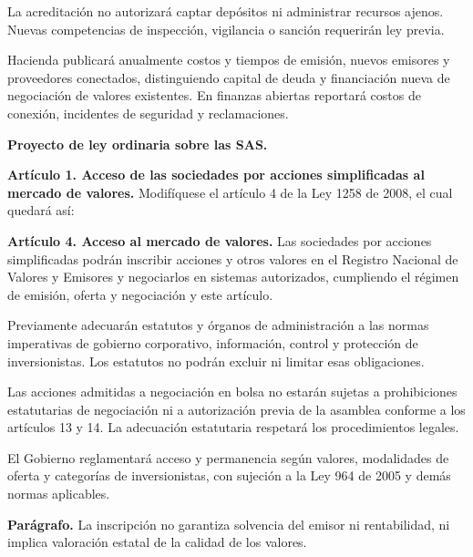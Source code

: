 La acreditación no autorizará captar depósitos ni administrar recursos ajenos. Nuevas competencias de inspección, vigilancia o sanción requerirán ley previa.

Hacienda publicará anualmente costos y tiempos de emisión, nuevos emisores y proveedores conectados, distinguiendo capital de deuda y financiación nueva de negociación de valores existentes. En finanzas abiertas reportará costos de conexión, incidentes de seguridad y reclamaciones.

\begingroup
\textbf{Proyecto de ley ordinaria sobre las SAS.}\par\nobreak

\begin{mdframed}[linewidth=0.6pt,linecolor=gray!60,backgroundcolor=gray!3,
  innertopmargin=10pt,innerbottommargin=10pt,innerleftmargin=10pt,innerrightmargin=10pt]
\textbf{Artículo 1. Acceso de las sociedades por acciones simplificadas al mercado de valores.} Modifíquese el artículo 4 de la Ley 1258 de 2008, el cual quedará así:

\textbf{Artículo 4. Acceso al mercado de valores.} Las sociedades por acciones simplificadas podrán inscribir acciones y otros valores en el Registro Nacional de Valores y Emisores y negociarlos en sistemas autorizados, cumpliendo el régimen de emisión, oferta y negociación y este artículo.

Previamente adecuarán estatutos y órganos de administración a las normas imperativas de gobierno corporativo, información, control y protección de inversionistas. Los estatutos no podrán excluir ni limitar esas obligaciones.

Las acciones admitidas a negociación en bolsa no estarán sujetas a prohibiciones estatutarias de negociación ni a autorización previa de la asamblea conforme a los artículos 13 y 14. La adecuación estatutaria respetará los procedimientos legales.

El Gobierno reglamentará acceso y permanencia según valores, modalidades de oferta y categorías de inversionistas, con sujeción a la Ley 964 de 2005 y demás normas aplicables.

\textbf{Parágrafo.} La inscripción no garantiza solvencia del emisor ni rentabilidad, ni implica valoración estatal de la calidad de los valores.
\end{mdframed}
\par\endgroup

